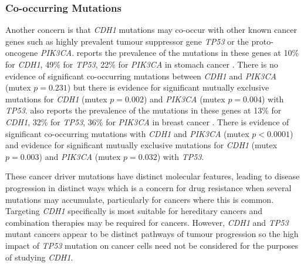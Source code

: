 \subsubsection{Co-occurring Mutations}

Another concern is that \textit{CDH1} \glspl{mutation} may co-occur with other known cancer  genes such as highly prevalent \gls{tumour suppressor} gene \textit{\textit{TP53}} or the proto-oncogene \textit{\textit{PIK3CA}}. \citet{cBioPortal} reports the prevalence of the \glspl{mutation} in these genes at 10\% for \textit{CDH1}, 49\% for \textit{\textit{TP53}}, 22\% for \textit{\textit{PIK3CA}} in stomach cancer \citep[393 samples]{TCGA2017prov}. There is no evidence of significant co-occurring \glspl{mutation} between \textit{CDH1} and \textit{\textit{PIK3CA}} (mutex $p=0.231$) but there is evidence for significant mutually exclusive \glspl{mutation} for \textit{CDH1} (mutex $p=0.002$) and \textit{\textit{PIK3CA}} (mutex $p=0.004$) with \textit{\textit{TP53}}. \citet{cBioPortal} also reports the prevalence of the \glspl{mutation} in these genes at 13\% for \textit{CDH1}, 32\% for \textit{\textit{TP53}}, 36\% for \textit{\textit{PIK3CA}} in breast cancer \citep[963 samples]{TCGA2017prov}. There is evidence of significant co-occurring \glspl{mutation} with \textit{CDH1} and \textit{\textit{PIK3CA}} (mutex $p<0.0001$) and evidence for significant mutually exclusive \glspl{mutation} for \textit{CDH1} (mutex $p=0.003$) and \textit{\textit{PIK3CA}} (mutex $p=0.032$) with \textit{\textit{TP53}}.

These cancer \glspl{driver mutation} have distinct molecular features, leading to disease progression in distinct ways which is a concern for drug resistance when several \glspl{mutation} may accumulate, particularly for  cancers where this is common. Targeting \textit{CDH1} specifically is most suitable for \gls{hereditary} cancers and combination therapies may be required for  cancers. However, \textit{CDH1} and \textit{\textit{TP53}} \gls{mutant} cancers appear to be distinct pathways of tumour progression so the high impact of \textit{\textit{TP53}} \gls{mutation} on cancer cells need not be considered for the purposes of studying \textit{CDH1}.
\fi

